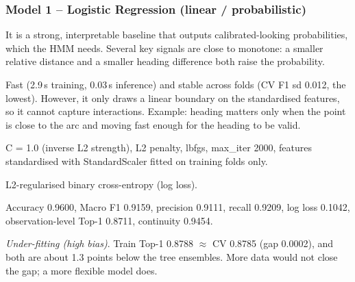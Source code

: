 \documentclass[10pt,a4paper]{article}
\newenvironment{qa}{\begin{description}[leftmargin=0pt,labelsep=0.4em,itemsep=2pt,font=\bfseries\color{accent!80!black}]}{\end{description}}
\begin{document}
\subsubsection*{Model 1 -- Logistic Regression (linear / probabilistic)}
\begin{qa}
\item[A1. Why suitable?] It is a strong, interpretable baseline that outputs calibrated-looking probabilities, which the HMM needs. Several key signals are close to monotone: a smaller relative distance and a smaller heading difference both raise the probability.
\item[A2. Strengths / limitations.] Fast (2.9\,s training, 0.03\,s inference) and stable across folds (CV F1 sd 0.012, the lowest). However, it only draws a linear boundary on the standardised features, so it cannot capture interactions. Example: heading matters only when the point is close to the arc and moving fast enough for the heading to be valid.
\item[B5. Hyperparameters.] C = 1.0 (inverse L2 strength), L2 penalty, lbfgs, max\_iter 2000, features standardised with StandardScaler fitted on training folds only.
\item[B6. Objective.] L2-regularised binary cross-entropy (log loss).
\item[C7/C8. Student-test.] Accuracy 0.9600, Macro F1 0.9159, precision 0.9111, recall 0.9209, log loss 0.1042, observation-level Top-1 0.8711, continuity 0.9454.
\item[C9. Fit.] \emph{Under-fitting (high bias)}. Train Top-1 0.8788 $\approx$ CV 0.8785 (gap 0.0002), and both are about 1.3 points below the tree ensembles. More data would not close the gap; a more flexible model does.
\end{qa}
\end{document}
